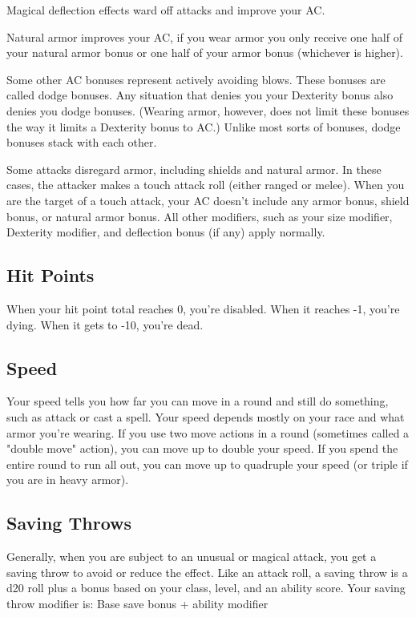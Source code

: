 Magical deflection effects ward off attacks and improve your AC.

Natural armor improves your AC, if you wear armor you only receive one half of your natural armor bonus or one half of your armor bonus (whichever is higher).

Some other AC bonuses represent actively avoiding blows. These bonuses are called dodge bonuses. Any situation that denies you your Dexterity bonus also denies you dodge bonuses. (Wearing armor, however, does not limit these bonuses the way it limits a Dexterity bonus to AC.) Unlike most sorts of bonuses, dodge bonuses stack with each other.

Some attacks disregard armor, including shields and natural armor. In these cases, the attacker makes a touch attack roll (either ranged or melee). When you are the target of a touch attack, your AC doesn't include any armor bonus, shield bonus, or natural armor bonus. All other modifiers, such as your size modifier, Dexterity modifier, and deflection bonus (if any) apply normally.

\subsection{Hit Points}

When your hit point total reaches 0, you're disabled. When it reaches -1, you're dying. When it gets to -10, you're dead.

\subsection{Speed}

Your speed tells you how far you can move in a round and still do something, such as attack or cast a spell. Your speed depends mostly on your race and what armor you're wearing. If you use two move actions in a round (sometimes called a "double move" action), you can move up to double your speed. If you spend the entire round to run all out, you can move up to quadruple your speed (or triple if you are in heavy armor).

\subsection{Saving Throws}

Generally, when you are subject to an unusual or magical attack, you get a saving throw to avoid or reduce the effect. Like an attack roll, a saving throw is a d20 roll plus a bonus based on your class, level, and an ability score. Your saving throw modifier is: Base save bonus + ability modifier

